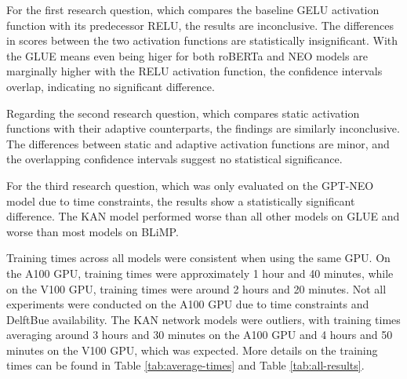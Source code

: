 For the first research question, which compares the baseline GELU activation function with its predecessor RELU, the results are inconclusive. The differences in scores between the two activation functions are statistically insignificant. With the GLUE means even being higer for both roBERTa and NEO models are marginally higher with the RELU activation function, the confidence intervals overlap, indicating no significant difference.

Regarding the second research question, which compares static activation functions with their adaptive counterparts, the findings are similarly inconclusive. The differences between static and adaptive activation functions are minor, and the overlapping confidence intervals suggest no statistical significance.

For the third research question, which was only evaluated on the GPT-NEO model due to time constraints, the results show a statistically significant difference. The KAN model performed worse than all other models on GLUE and worse than most models on BLiMP.

Training times across all models were consistent when using the same GPU. On the A100 GPU, training times were approximately 1 hour and 40 minutes, while on the V100 GPU, training times were around 2 hours and 20 minutes. Not all experiments were conducted on the A100 GPU due to time constraints and DelftBue \cite{DHPC2024} availability. The KAN network models were outliers, with training times averaging around 3 hours and 30 minutes on the A100 GPU and 4 hours and 50 minutes on the V100 GPU, which was expected. More details on the training times can be found in Table \ref{tab:average-times} and Table \ref{tab:all-results}.